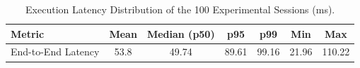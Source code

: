 \begin{table}[!htbp]
\renewcommand{\arraystretch}{1.05}
\centering
\small
\caption{Execution Latency Distribution of the 100 Experimental Sessions (ms).}
\label{tab:session_latency}
\vspace{4pt}
\begin{tabular}{l c c c c c c}
\hline
Metric & Mean & Median (p50) & p95 & p99 & Min & Max \\
\hline
End-to-End Latency & 53.8 & 49.74 & 89.61 & 99.16 & 21.96 & 110.22 \\
\hline
\end{tabular}
\end{table}
